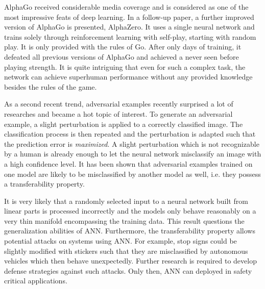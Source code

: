 AlphaGo received considerable media coverage and is considered as one of the most impressive feats of deep learning. In a follow-up paper, a further improved version of AlphaGo is presented, AlphaZero\cite{silver2017mastering}. It uses a single neural network and trains solely through reinforcement learning with self-play, starting with random play. It is only provided with the rules of Go. After only days of training, it defeated all previous versions of AlphaGo and achieved a never seen before playing strength. It is quite intriguing that even for such a complex task, the network can achieve superhuman performance without any provided knowledge besides the rules of the game.

As a second recent trend, adversarial examples recently surprised a lot of researches and became a hot topic of interest. To generate an adversarial example, a slight perturbation is applied to a correctly classified image. The classification process is then repeated and the perturbation is adapted such that the prediction error is \textit{maximized}. A slight perturbation which is not recognizable by a human is already enough to let the neural network misclassify an image with a high confidence level\cite{Nguyen_2015_CVPR}. It has been shown that adversarial examples trained on one model are likely to be misclassified by another model as well, i.e. they possess a transferability property\cite{szegedy2013intriguing}.

It is very likely that a randomly selected input to a neural network built from linear parts is processed incorrectly and the models only behave reasonably on a very thin manifold encompassing the training data\cite{goodfellow2014explaining}. This result questions the generalization abilities of ANN. Furthermore, the transferability property allows potential attacks on systems using ANN\cite{kurakin2016adversarial}\cite{papernot2017practical}. For example, stop signs could be slightly modified with stickers such that they are misclassified by autonomous vehicles which then behave unexpectedly. Further research is required to develop defense strategies against such attacks. Only then, ANN can deployed in safety critical applications. 
